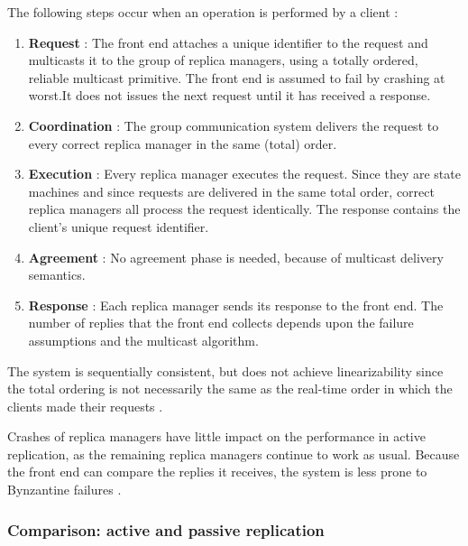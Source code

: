 The following steps occur when an operation is performed by a client \cite{Coulouris:2011:DSC:2029110}:
\begin{enumerate}
	\item \textbf{Request} : The front end attaches a unique identifier to the request and multicasts it to the group of replica managers, using a totally ordered, reliable multicast primitive. The front end is assumed to fail by crashing at worst.It does not issues the next request until it has received a response.
	\item \textbf{Coordination} : The group communication system delivers the request to every correct replica manager in the same (total) order.
	\item \textbf{Execution} : Every replica manager executes the request. Since they are state machines and since requests are delivered in the same total order, correct replica managers all process the request identically. The response contains the client's unique request identifier.
	\item \textbf{Agreement} : No agreement phase is needed, because of multicast delivery semantics.
	\item \textbf{Response} : Each replica manager sends its response to the front end. The number of replies that the front end collects depends upon the failure assumptions and the multicast algorithm.
\end{enumerate}

The system is sequentially consistent, but does not achieve linearizability since the total ordering is not necessarily the same as the real-time order in which the clients made their requests \cite{Coulouris:2011:DSC:2029110}.

Crashes of replica managers have little impact on the performance in active replication, as the remaining replica managers continue to work as usual. Because the front end can compare the replies it receives, the system is less prone to Bynzantine failures \cite{Coulouris:2011:DSC:2029110}.


\subsubsection{Comparison: active and passive replication}


